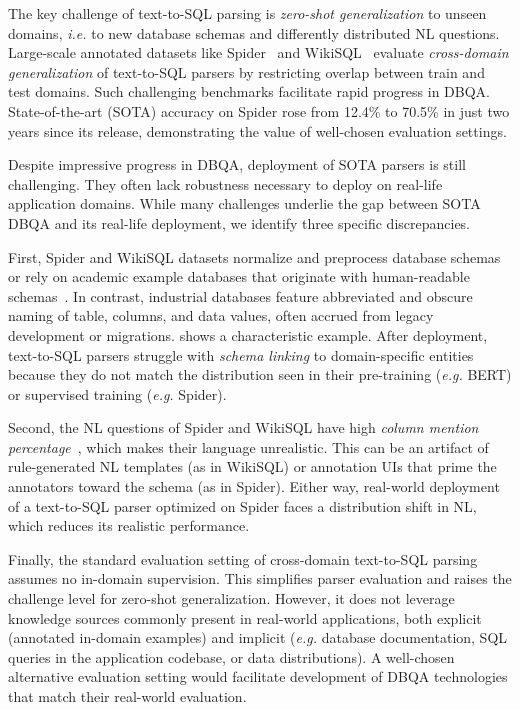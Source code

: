 \documentclass[11pt,a4paper]{article}
\newcommand{\eg}{\textit{e.g.}\xspace}
\newcommand{\ie}{\textit{i.e.}\xspace}
\begin{document}
The key challenge of text-to-SQL parsing is \emph{zero-shot generalization} to unseen domains, \ie
to new database schemas and differently distributed NL questions.
Large-scale annotated datasets like Spider~\cite{yu-etal-2018-spider} and WikiSQL~\cite{zhong2017seq2sql}
evaluate \emph{cross-domain generalization} of text-to-SQL parsers by restricting overlap between train and test
domains.
Such challenging benchmarks facilitate rapid progress in DBQA.
State-of-the-art (SOTA) accuracy on Spider rose from 12.4\% to 70.5\% in just two years since its release,
demonstrating the value of well-chosen evaluation settings.

Despite impressive progress in DBQA, deployment of SOTA parsers is still challenging.
They often lack robustness necessary to deploy on real-life application domains.
While many challenges underlie the gap between SOTA DBQA and its real-life deployment, we identify three
specific discrepancies. 

First, Spider and WikiSQL datasets normalize and preprocess database schemas or rely on academic example databases that
originate with human-readable schemas~\cite{suhr2020exploring}.
In contrast, industrial databases feature abbreviated and obscure naming of table, columns, and data values, often
accrued from legacy development or migrations.
 shows a characteristic example.
After deployment, text-to-SQL parsers struggle with \emph{schema linking} to domain-specific entities because
they do not match the distribution seen in their pre-training (\eg BERT) or supervised training (\eg Spider).

Second, the NL questions of Spider and WikiSQL have high \emph{column mention
percentage}~\cite{deng2020structure}, which makes their language unrealistic.
This can be an artifact of rule-generated NL templates (as in WikiSQL) or annotation UIs that prime the
annotators toward the schema (as in Spider).
Either way, real-world deployment of a text-to-SQL parser optimized on Spider faces a
distribution shift in NL, which reduces its realistic performance.


Finally, the standard evaluation setting of cross-domain text-to-SQL parsing assumes no in-domain supervision.
This simplifies parser evaluation and raises the challenge level for zero-shot generalization.
However, it does not leverage knowledge sources commonly present in real-world applications, both explicit (annotated
in-domain examples) and implicit (\eg database documentation, SQL queries in the application
codebase, or data distributions).
A well-chosen alternative evaluation setting would facilitate development of DBQA technologies that match their
real-world evaluation.
\end{document}
